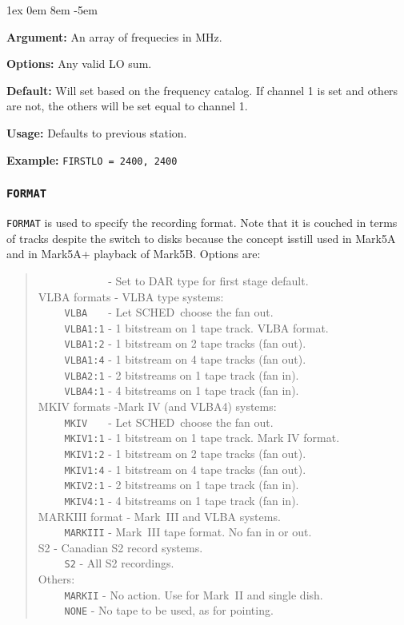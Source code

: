 \documentclass{report}
\newcommand{\schedb}{{\sc SCHED~}}
\newcommand{\rcwbox}[5]{
  \begin{list}{}{\parsep 1ex  \itemsep 0em
                 \leftmargin 8em  \itemindent -5em }
    \item {\bf Argument:} #1
    \item {\bf Options:}  #2
    \item {\bf Default:}  #3
    \item {\bf Usage:}    #4
    \item {\bf Example:}  #5
  \end{list}
}
\begin{document}
\rcwbox
{An array of frequecies in MHz.}
{Any valid LO sum.}
{Will set based on the frequency catalog.  If channel 1 is set and
others are not, the others will be set equal to channel 1.}
{Defaults to previous station.}
{{\tt FIRSTLO = 2400, 2400}}


\subsubsection{\label{SP:FORMAT}{\tt FORMAT}}

{\tt FORMAT} is used to specify the recording format. Note that it is couched
in terms of tracks despite the switch to disks because the concept isstill
used in Mark5A and in Mark5A+ playback of Mark5B.  Options are:
\begin{verse}

\noindent ~~~~ {\tt ~~~~~~~} - Set to DAR type for first stage default.\\
\noindent VLBA formats - VLBA type systems:  \\
\noindent ~~~~ {\tt VLBA~~~} - Let \schedb choose the fan out. \\
\noindent ~~~~ {\tt VLBA1:1} - 1 bitstream on 1 tape track. VLBA format.  \\
\noindent ~~~~ {\tt VLBA1:2} - 1 bitstream on 2 tape tracks (fan out).    \\
\noindent ~~~~ {\tt VLBA1:4} - 1 bitstream on 4 tape tracks (fan out).    \\
\noindent ~~~~ {\tt VLBA2:1} - 2 bitstreams on 1 tape track (fan in).     \\
\noindent ~~~~ {\tt VLBA4:1} - 4 bitstreams on 1 tape track (fan in).     \\
\noindent MKIV formats -Mark IV (and VLBA4) systems:  \\
\noindent ~~~~ {\tt MKIV~~~} - Let \schedb choose the fan out. \\
\noindent ~~~~ {\tt MKIV1:1} - 1 bitstream on 1 tape track. Mark IV format.  \\
\noindent ~~~~ {\tt MKIV1:2} - 1 bitstream on 2 tape tracks (fan out).    \\
\noindent ~~~~ {\tt MKIV1:4} - 1 bitstream on 4 tape tracks (fan out).    \\
\noindent ~~~~ {\tt MKIV2:1} - 2 bitstreams on 1 tape track (fan in).     \\
\noindent ~~~~ {\tt MKIV4:1} - 4 bitstreams on 1 tape track (fan in).     \\
\noindent MARKIII format - Mark~III and VLBA systems. \\
\noindent ~~~~ {\tt MARKIII} - Mark~III tape format. No fan in or out.    \\
\noindent S2 - Canadian S2 record systems. \\
\noindent ~~~~ {\tt S2} - All S2 recordings. \\
\noindent Others:  \\
\noindent ~~~~ {\tt MARKII}  - No action. Use for Mark~II and single dish.\\
\noindent ~~~~ {\tt NONE}    - No tape to be used, as for pointing.       \\
\end{verse}
\end{document}

